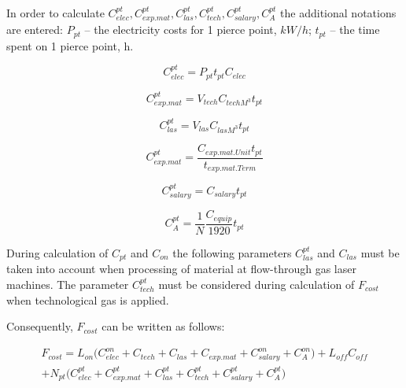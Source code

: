 \documentclass[runningheads]{llncs}
\begin{document}
In order to calculate $C^{pt}_{elec}, C^{pt}_{exp.mat}, C^{pt}_{las}, C^{pt}_{tech},
C^{pt}_{salary}, C^{pt}_A$
the additional notations are entered:
$P_{pt}$ – the electricity costs for 1 pierce point, $kW/h$;
$t_{pt}$  – the time spent on 1 pierce point, h.

\begin{equation}
  \label{eq1.12}
  C^{pt}_{elec} = P_{pt} t_{pt} C_{elec}
\end{equation}

\begin{equation}
  \label{eq1.13}
  C^{pt}_{exp.mat} = V_{tech} C_{tech M^3} t_{pt}
\end{equation}

\begin{equation}
  \label{eq1.14}
  C^{pt}_{las} = V_{las} C_{las M^3} t_{pt}
\end{equation}

\begin{equation}
  \label{eq1.15}
  C^{pt}_{exp.mat} = \frac{C_{exp.mat.Unit} t_{pt}}{t_{exp.mat.Term}}
\end{equation}

\begin{equation}
  \label{eq1.16}
  C^{pt}_{salary} = C_{salary} t_{pt}
\end{equation}

\begin{equation}
  \label{eq1.17}
  C^{pt}_A = \frac{1}N \frac{C_{equip}}{1920} t_{pt}
\end{equation}

During calculation of $C_{pt}$
and $C_{on}$
the following parameters $C^{pt}_{las}$
and $C_{las}$ must be taken into account
when processing of material at flow-through gas laser machines.
The parameter $C^{pt}_{tech}$
must be considered during calculation of $F_{cost}$
when technological gas is applied.

Consequently, $F_{cost}$
can be written as follows:

\begin{multline}
  \label{eq1.18}
  F_{cost}
  = L_{on} \Big(
    C^{on}_{elec} + C_{tech} + C_{las} + C_{exp.mat} + C^{on}_{salary} + C^{on}_A
    \Big)
  + L_{off} C_{off} \\
  + N_{pt} \Big(
    C^{pt}_{elec} + C^{pt}_{exp.mat} + C^{pt}_{las} + C^{pt}_{tech} + C^{pt}_{salary} + C^{pt}_A
    \Big)
\end{multline}
\end{document}
